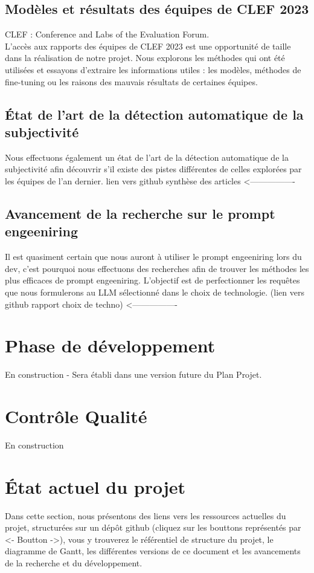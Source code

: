\documentclass[11pt]{rapport_class}
\begin{document}
\section{Modèles et résultats des équipes de CLEF 2023}
CLEF : Conference and Labs of the Evaluation Forum.\\
\vspace{0mm}
\qquad L'accès aux rapports des équipes de CLEF 2023 est une opportunité de taille dans la réalisation de notre projet. Nous explorons les méthodes qui ont été utilisées et essayons d'extraire les informations utiles : les modèles, méthodes de fine-tuning ou les raisons des mauvais résultats de certaines équipes.

\section{État de l'art de la détection automatique de la subjectivité}
\qquad Nous effectuons également un état de l'art de la détection automatique de la subjectivité afin découvrir s'il existe des pistes différentes de celles explorées par les équipes de l'an dernier.
lien vers github synthèse des articles <----------------


\section{Avancement de la recherche sur le prompt engeeniring}
\qquad Il est quasiment certain que nous auront à utiliser le prompt engeeniring lors du dev, c'est pourquoi nous effectuons des recherches afin de trouver les méthodes les plus efficaces de prompt engeeniring. L'objectif est de perfectionner les requêtes que nous formulerons au LLM sélectionné dans le choix de technologie.
 (lien vers github rapport choix de techno) <----------------



\chapter{Phase de développement}
\centerline{En construction - Sera établi dans une version future du Plan Projet.}

\chapter{Contrôle Qualité}
\centerline{En construction}


\chapter{ État actuel du projet}
\qquad Dans cette section, nous présentons des liens vers les ressources actuelles du projet, structurées sur un dépôt github (cliquez sur les bouttons représentés par <- Boutton ->), vous y trouverez le référentiel de structure du projet, le diagramme de Gantt, les différentes versions de ce document et les avancements de la recherche et du développement.
\end{document}
